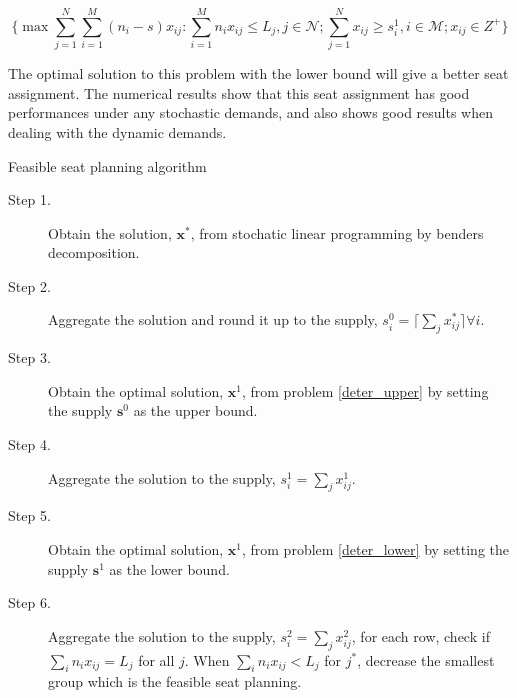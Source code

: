 \begin{equation}\label{deter_lower}
\{\max \sum_{j=1}^{N} \sum_{i=1}^{M}(n_i -s)x_{ij}: \sum_{i = 1}^{M} n_i x_{ij} \leq L_{j}, j \in \mathcal{N}; \sum_{j =1}^{N} x_{ij} \geq s_{i}^{1}, i \in \mathcal{M}; x_{ij} \in Z^{+} \}
\end{equation}


The optimal solution to this problem with the lower bound will give a better seat assignment. The numerical results show that this seat assignment has good performances under any stochastic demands, and also shows good results when dealing with the dynamic demands. 






\begin{algorithm}[H]
  \caption{Feasible seat planning algorithm}\label{feasible_seat}
    \begin{description}
    \item[Step 1.] Obtain the solution, $\mathbf{x}^{*}$, from stochatic linear programming by benders decomposition.

    \item[Step 2.] Aggregate the solution and round it up to the supply, ${s}_{i}^{0} =\lceil \sum_{j} x^{*}_{ij} \rceil \forall i$.

    \item[Step 3.] Obtain the optimal solution, $\mathbf{x}^{1}$, from problem \eqref{deter_upper} by setting the supply $\mathbf{s}^{0}$ as the upper bound. 
    
    \item[Step 4.] Aggregate the solution to the supply, ${s}_{i}^{1} = \sum_{j} x^{1}_{ij}$.

    \item[Step 5.] Obtain the optimal solution, $\mathbf{x}^{1}$, from problem \eqref{deter_lower} by setting the supply $\mathbf{s}^{1}$ as the lower bound.

    \item[Step 6.] Aggregate the solution to the supply, ${s}_{i}^{2} = \sum_{j} x^{2}_{ij}$, for each row, check if $\sum_{i} n_i x_{ij} = L_j$ for all $j$. When $\sum_{i} n_i x_{ij} < L_j$ for $j^{*}$, decrease the smallest group
    which is the feasible seat planning.
   \end{description}
  \end{algorithm}

